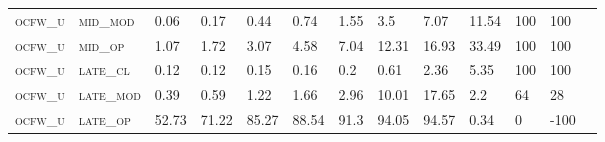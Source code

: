 \begin{landscape}
\begin{table}[!htbp]
\begin{tabular}{@{}lllllllllllll@{}}
\footnotesize \textsc{ocfw\_u}     & \footnotesize \textsc{mid\_mod  }                & \footnotesize 0.06          & \footnotesize 0.17           & \footnotesize 0.44             & \footnotesize 0.74            & \footnotesize 1.55            & \footnotesize 3.5             & \footnotesize 7.07       & \footnotesize 11.54    & \footnotesize 100    & \footnotesize 100    \\
\footnotesize \textsc{ocfw\_u}     & \footnotesize \textsc{mid\_op   }                & \footnotesize 1.07          & \footnotesize 1.72           & \footnotesize 3.07             & \footnotesize 4.58            & \footnotesize 7.04            & \footnotesize 12.31           & \footnotesize 16.93      & \footnotesize 33.49    & \footnotesize 100    & \footnotesize 100    \\
\footnotesize \textsc{ocfw\_u}     & \footnotesize \textsc{late\_cl  }                & \footnotesize 0.12          & \footnotesize 0.12           & \footnotesize 0.15             & \footnotesize 0.16            & \footnotesize 0.2             & \footnotesize 0.61            & \footnotesize 2.36       & \footnotesize 5.35     & \footnotesize 100    & \footnotesize 100    \\
\footnotesize \textsc{ocfw\_u}     & \footnotesize \textsc{late\_mod }                & \footnotesize 0.39          & \footnotesize 0.59           & \footnotesize 1.22             & \footnotesize 1.66            & \footnotesize 2.96            & \footnotesize 10.01           & \footnotesize 17.65      & \footnotesize 2.2      & \footnotesize 64     & \footnotesize 28    \\
\footnotesize \textsc{ocfw\_u}     & \footnotesize \textsc{late\_op  }                & \footnotesize 52.73         & \footnotesize 71.22          & \footnotesize 85.27            & \footnotesize 88.54           & \footnotesize 91.3            & \footnotesize 94.05           & \footnotesize 94.57      & \footnotesize 0.34     & \footnotesize 0      & \footnotesize -100    \\
\end{tabular}
\end{table}
\end{landscape}


